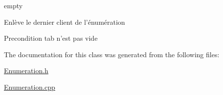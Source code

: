 empty 

\-Enlève le dernier client de l'énumération \begin{DoxyPrecond}{\-Precondition}
tab n'est pas vide 
\end{DoxyPrecond}


\-The documentation for this class was generated from the following files\-:\begin{DoxyCompactItemize}
\item 
\hyperlink{Enumeration_8h}{\-Enumeration.\-h}\item 
\hyperlink{Enumeration_8cpp}{\-Enumeration.\-cpp}\end{DoxyCompactItemize}
